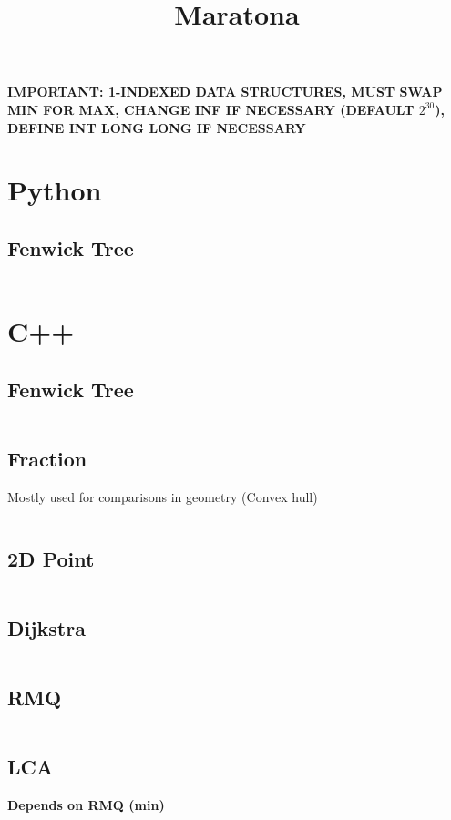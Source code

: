 \documentclass{article}
\title{Maratona}
\author{}
\date{}
\begin{document}
\maketitle

\textbf{IMPORTANT: 1-INDEXED DATA STRUCTURES, MUST SWAP MIN FOR MAX,
CHANGE INF IF NECESSARY (DEFAULT $2^{30}$), DEFINE INT LONG LONG IF NECESSARY}

\tableofcontents
\newpage

\section{Python}
\subsection{Fenwick Tree}
\inputminted{python}{code/fenwick.py}

\section{C++}
\subsection{Fenwick Tree}
\inputminted[obeytabs=true,tabsize=4]{cpp}{code/fenwick.cpp}
\subsection{Fraction}
Mostly used for comparisons in geometry (Convex hull)
\inputminted[obeytabs=true,tabsize=4]{cpp}{code/fraction.cpp}
\subsection{2D Point}
\inputminted[obeytabs=true,tabsize=4]{cpp}{code/point.cpp}
\subsection{Dijkstra}
\inputminted[obeytabs=true,tabsize=4]{cpp}{code/dijkstra.cpp}
\subsection{RMQ}
\inputminted[obeytabs=true,tabsize=4]{cpp}{code/rmq.cpp}
\subsection{LCA}
\textbf{Depends on RMQ (min)}
\inputminted[obeytabs=true,tabsize=4]{cpp}{code/lca.cpp}
\end{document}
